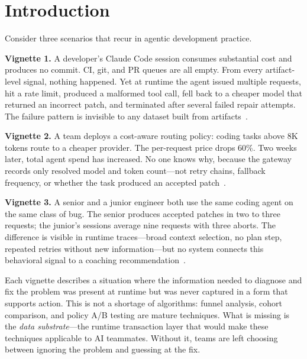 \documentclass[sigconf,anonymous,review]{acmart}
\begin{document}
\section{Introduction}
\label{sec:intro}

Consider three scenarios that recur in agentic development practice.

\textbf{Vignette 1.} A developer's Claude Code session consumes
substantial cost and produces no commit. CI, git, and PR queues are
all empty. From every artifact-level signal, nothing happened. Yet
at runtime the agent issued multiple requests, hit a rate limit,
produced a malformed tool call, fell back to a cheaper model that
returned an incorrect patch, and terminated after several failed
repair attempts. The failure pattern is invisible to any dataset
built from artifacts~\cite{nakashima2026rejected, ehsani2026fail}.

\textbf{Vignette 2.} A team deploys a cost-aware routing policy:
coding tasks above 8K tokens route to a cheaper provider. The
per-request price drops 60\%. Two weeks later, total agent spend has
increased. No one knows why, because the gateway records only
resolved model and token count---not retry chains, fallback
frequency, or whether the task produced an accepted
patch~\cite{routecollapse2026, routingsurvey2026}.

\textbf{Vignette 3.} A senior and a junior engineer both use the
same coding agent on the same class of bug. The senior produces
accepted patches in two to three requests; the junior's sessions
average nine requests with three aborts. The difference is visible
in runtime traces---broad context selection, no plan step, repeated
retries without new information---but no system connects this
behavioral signal to a coaching recommendation~\cite{agentlens2026,
lu2025autonomous}.

Each vignette describes a situation where the information needed to
diagnose and fix the problem was present at runtime but was never
captured in a form that supports action. This is not a shortage of
algorithms: funnel analysis, cohort comparison, and policy A/B
testing are mature techniques. What is missing is the \emph{data
substrate}---the runtime transaction layer that would make these
techniques applicable to AI teammates. Without it, teams are left
choosing between ignoring the problem and guessing at the fix.
\end{document}
